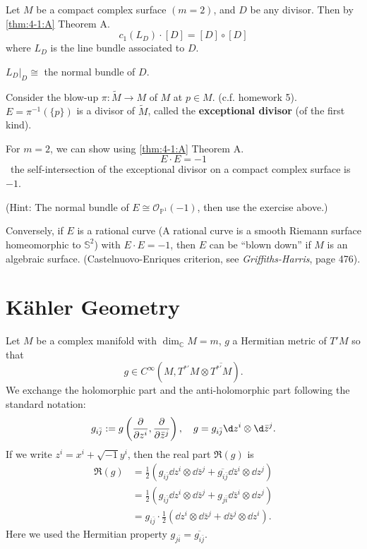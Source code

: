 \documentclass[12pt]{article}
\begin{document}
Let \(M\) be a compact complex surface \((m=2)\), and \(D\) be any divisor. Then by
\ifdefined\FullBook{} \cref{thm:4-1:A}
\else Theorem A.
\fi \[
  c_1(L_D)\cdot [D]=[D]\circ [D]
\] where \(L_D\) is the line bundle associated to \(D\).

\begin{exercise}
  \(L_D\Big|_{D}\cong\) the normal bundle of \(D\).
\end{exercise}

Consider the blow-up \(\pi\colon \tilde{M}\to M\) of \(M\) at \(p\in M\). (c.f. homework
5). \(E=\pi^{-1}(\{p\})\) is a divisor of \(\tilde{M}\), called the \textbf{
exceptional divisor} (of the first kind).

For \(m=2\), we can show using
\ifdefined\FullBook{} \cref{thm:4-1:A}
\else Theorem A.
\fi \[
  E\cdot E=-1
\] \ie\ the self-intersection of the exceptional divisor on a compact complex surface
is \(-1\).

(Hint: The normal bundle of \(E\cong \mathcal{O}_{\mathbb{P}^1}(-1)\), then use the
exercise above.)

Conversely, if \(E\) is a rational curve (A rational curve is a smooth Riemann surface
homeomorphic to \(\mathbb{S}^2\)) with \(E\cdot E=-1\), then \(E\) can be
``blown down'' if \(M\) is an algebraic surface. (Castelnuovo-Enriques criterion,
see \emph{Griffiths-Harris}, page 476). 

\section{K\"ahler Geometry}

Let \(M\) be a complex manifold with \(\dim_{\mathbb{C}}M=m\), \(g\) a Hermitian metric
of \(T'M\) so that \[
  g\in C^\infty(M,T^{*\prime}M\otimes \overline{T^{*\prime}M})
.\] We exchange the holomorphic part and the anti-holomorphic part following the
standard notation: \[
  g_{i\bar{j}}:=g\left(\pd{z^i},\pd{\bar{z}^j}\right),\quad
  g=g_{i\bar{j}}\dd{z^i}\otimes \dd{\bar{z}^j}
.\] If we write \(z^i=x^i+\sqrt{-1}y^i\), then the real part \(\Re(g)\) is 
\begin{align*}
  \Re(g)&=\frac{1}{2}(g_{i\bar{j}}\dd{z^i}\otimes \dd{\bar{z}^j}
  +\overline{g_{i\bar{j}}}\dd{\bar{z}^i}\otimes \dd{z^j}) \\
  &=\frac{1}{2}(g_{i\bar{j}}\dd{z^i}\otimes \dd{\bar{z}^j}+g_{j\bar{i}}\dd{\bar{z}^i}
  \otimes \dd{z^j}) \\
  &=g_{i\bar{j}}\cdot \frac{1}{2}(\dd{z^i}\otimes \dd{\bar{z}^j}
  +\dd{\bar{z}^j}\otimes \dd{z^i})
.\end{align*}
Here we used the Hermitian property \(g_{j\bar{i}}=\overline{g_{i\bar{j}}}\).
\end{document}
